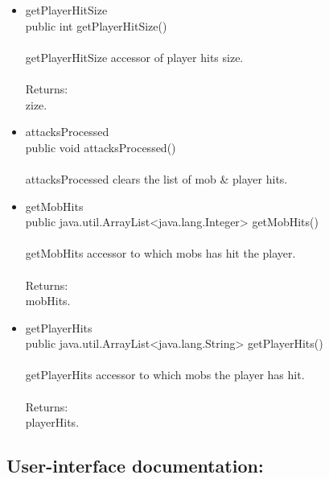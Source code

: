 \documentclass[letterpaper]{article}
\begin{document}
\begin{itemize}
\begin{itemize}
														\item	getPlayerHitSize \\
																public int getPlayerHitSize() \\ \\
																getPlayerHitSize accessor of player hits size. \\ \\
																Returns: \\ 
																zize.\\
														\item	attacksProcessed \\
																public void attacksProcessed() \\ \\
																attacksProcessed clears the list of mob \& player hits. \\
														\item	getMobHits \\
																public java.util.ArrayList<java.lang.Integer> getMobHits() \\ \\
																getMobHits accessor to which mobs has hit the player. \\ \\
																Returns: \\
																mobHits. \\
														\item	getPlayerHits \\
																public java.util.ArrayList<java.lang.String> getPlayerHits() \\ \\
																getPlayerHits accessor to which mobs the player has hit. \\ \\
																Returns: \\
																playerHits. \\
													\end{itemize}
										\end{itemize}
							
							\vspace{0.2in}
							\subsection*{User-interface documentation:}
							\vspace{0.1in}
							
\end{document}
